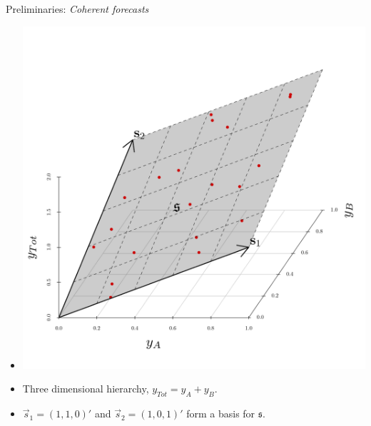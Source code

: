 \documentclass[11pt,xcolor=dvipsnames,handout]{beamer}
\begin{document}

\begin{frame}{Preliminaries: \textit{Coherent forecasts}}
\begin{itemize}
	\item[] 		
	\begin{center}
		\vspace{-1.3cm}
		\includegraphics[scale=0.40]{Figures/3D_hierarchy}
	\end{center}
	\item Three dimensional hierarchy, $y_{Tot} = y_A + y_B$.
	\item $\vec{s}_1 = (1,1,0)'$ and $\vec{s}_2 = (1, 0, 1)'$ form a basis for $\mathfrak{s}$.
\end{itemize}    
\end{frame}
\end{document}
